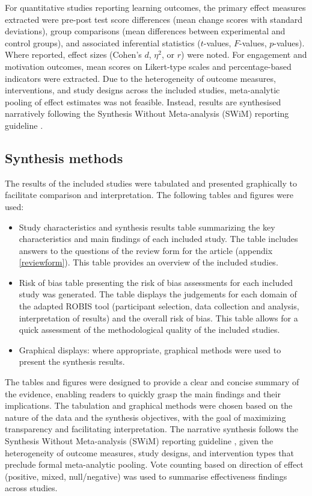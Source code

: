 \documentclass[a4paper,fleqn]{cas-sc}
\begin{document}
For quantitative studies reporting learning outcomes, the primary effect measures extracted were pre-post test score differences (mean change scores with standard deviations), group comparisons (mean differences between experimental and control groups), and associated inferential statistics ($t$-values, $F$-values, $p$-values). Where reported, effect sizes (Cohen's $d$, $\eta^2$, or $r$) were noted. For engagement and motivation outcomes, mean scores on Likert-type scales and percentage-based indicators were extracted. Due to the heterogeneity of outcome measures, interventions, and study designs across the included studies, meta-analytic pooling of effect estimates was not feasible. Instead, results are synthesised narratively following the Synthesis Without Meta-analysis (SWiM) reporting guideline \citep{Campbell2020}.

\subsection{Synthesis methods}

The results of the included studies were tabulated and presented graphically to facilitate comparison and interpretation. The following tables and figures were used:

\begin{itemize}[noitemsep]
 \item {Study characteristics and synthesis results table} summarizing the key characteristics and main findings of each included study. The table includes answers to the questions of the review form for the article (appendix \ref{reviewform}). This table provides an overview of the included studies.
 
 \item {Risk of bias table} presenting the risk of bias assessments for each included study was generated. The table displays the judgements for each domain of the adapted ROBIS tool (participant selection, data collection and analysis, interpretation of results) and the overall risk of bias. This table allows for a quick assessment of the methodological quality of the included studies.
 
 \item {Graphical displays}: where appropriate, graphical methods were used to present the synthesis results.
\end{itemize}

The tables and figures were designed to provide a clear and concise summary of the evidence, enabling readers to quickly grasp the main findings and their implications. The tabulation and graphical methods were chosen based on the nature of the data and the synthesis objectives, with the goal of maximizing transparency and facilitating interpretation. The narrative synthesis follows the Synthesis Without Meta-analysis (SWiM) reporting guideline \citep{Campbell2020}, given the heterogeneity of outcome measures, study designs, and intervention types that preclude formal meta-analytic pooling. Vote counting based on direction of effect (positive, mixed, null/negative) was used to summarise effectiveness findings across studies.
\end{document}
